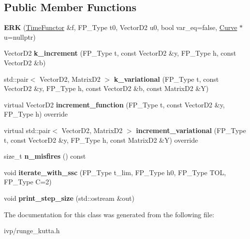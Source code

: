 \subsection*{Public Member Functions}
\begin{DoxyCompactItemize}
\item 
\mbox{\label{classERK_a354218adfe6be3dd211d263524cdda94}} 
{\bfseries E\+RK} (\hyperlink{classTimeFunctor}{Time\+Functor} \&f, F\+P\+\_\+\+Type t0, Vector\+D2 u0, bool var\+\_\+eq=false, \hyperlink{classCurve}{Curve} $\ast$u=nullptr)
\item 
\mbox{\label{classERK_ab3dcc059386d02ae76f229dba8909ad3}} 
Vector\+D2 {\bfseries k\+\_\+increment} (F\+P\+\_\+\+Type t, const Vector\+D2 \&y, F\+P\+\_\+\+Type h, const Vector\+D2 \&b)
\item 
\mbox{\label{classERK_a93428c63320ddc6ec072eb737bf57ba3}} 
std\+::pair$<$ Vector\+D2, Matrix\+D2 $>$ {\bfseries k\+\_\+variational} (F\+P\+\_\+\+Type t, const Vector\+D2 \&y, F\+P\+\_\+\+Type h, const Vector\+D2 \&b, const Matrix\+D2 \&Y)
\item 
\mbox{\label{classERK_afdc6a96a8264b23acdeb0d2a31b42f8d}} 
virtual Vector\+D2 {\bfseries increment\+\_\+function} (F\+P\+\_\+\+Type t, const Vector\+D2 \&y, F\+P\+\_\+\+Type h) override
\item 
\mbox{\label{classERK_adac215657421b485e20292f0793b8611}} 
virtual std\+::pair$<$ Vector\+D2, Matrix\+D2 $>$ {\bfseries increment\+\_\+variational} (F\+P\+\_\+\+Type t, const Vector\+D2 \&y, F\+P\+\_\+\+Type h, const Matrix\+D2 \&Y) override
\item 
\mbox{\label{classERK_ae3f71b3f5364ffcab63a715d95adb911}} 
size\+\_\+t {\bfseries n\+\_\+misfires} () const
\item 
\mbox{\label{classERK_a4f4ae1888656dbbf03f3cc9d22177f7e}} 
void {\bfseries iterate\+\_\+with\+\_\+ssc} (F\+P\+\_\+\+Type t\+\_\+lim, F\+P\+\_\+\+Type h0, F\+P\+\_\+\+Type T\+OL, F\+P\+\_\+\+Type C=2)
\item 
\mbox{\label{classERK_a6057b70fbd97bbe2e5b2d0233aef46a4}} 
void {\bfseries print\+\_\+step\+\_\+size} (std\+::ostream \&out)
\end{DoxyCompactItemize}


The documentation for this class was generated from the following file\+:\begin{DoxyCompactItemize}
\item 
ivp/runge\+\_\+kutta.\+h\end{DoxyCompactItemize}
